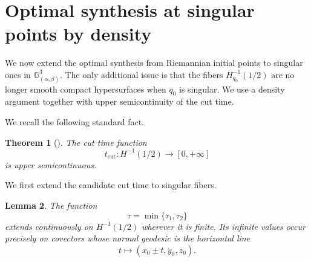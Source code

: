 \documentclass[12pt]{amsart}
\numberwithin{equation}{section}
\theoremstyle{plain}
\newtheorem{theorem}{Theorem}[section]
\newtheorem{lemma}[theorem]{Lemma}%
\theoremstyle{definition}
\theoremstyle{remark}
\begin{document}
\section{Optimal synthesis at singular points by density}\label{Singular Points}
We now extend the optimal synthesis from Riemannian initial points to singular ones in
\(\mathbb G^3_{(\alpha,\beta)}\). The only additional issue is that the fibers
\(H_{q_0}^{-1}(1/2)\) are no longer smooth compact hypersurfaces when \(q_0\) is singular.
We use a density argument together with upper semicontinuity of the cut time.

We recall the following standard fact.

\begin{theorem}[{\cite[Prop. 8.76]{AgrachevBarilariBoscainBook2020}}]
    \label{cut time cont}
    The cut time function
    \[
        t_{\operatorname{cut}}:H^{-1}(1/2)\to[0,+\infty]
    \]
    is upper semicontinuous.
\end{theorem}

We first extend the candidate cut time to singular fibers.

\begin{lemma}\label{Singular Opt Synth}
    The function
    \[
        \tau=\min\{\tau_1,\tau_2\}
    \]
    extends continuously on \(H^{-1}(1/2)\) wherever it is finite. Its infinite values occur
    precisely on covectors whose normal geodesic is the horizontal line
    \[
        t\mapsto (x_0\pm t,y_0,z_0).
    \]
\end{lemma}
\end{document}
